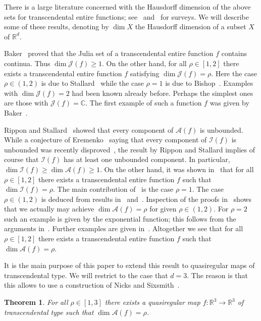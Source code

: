 \documentclass[12pt,a4paper]{amsart}
\theoremstyle{plain}
\newtheorem{theorem}{Theorem}[section]
\theoremstyle{definition}
\theoremstyle{remark}
\def\C{\mathbb C}
\def\R{\mathbb R}
\def\cA{\mathcal A}
\def\cI{\mathcal I}
\def\cJ{\mathcal J}
\numberwithin{equation}{section}
\begin{document}
There is a large literature concerned with the Hausdorff dimension of the above sets
for transcendental entire functions; see~\cite{Kotus2008} and~\cite{Stallard2008}
for surveys.
We will describe some of these results, denoting by
$\dim X$ the Hausdorff dimension of a subset $X$ of $\R^d$.

Baker~\cite{Baker1975} proved that the Julia set of 
a transcendental entire function $f$ contains continua.  Thus $\dim \cJ(f)\geq 1$.
On the other hand, for all $\rho\in[1,2]$ there exists a transcendental entire
function $f$ satisfying $\dim \cJ(f)=\rho$. Here the case $\rho\in (1,2)$ is due to 
Stallard~\cite[Theorem~1.1]{Stallard2000} while the case $\rho=1$ is due to 
Bishop~\cite{Bishop2018}. Examples with $\dim \cJ(f)=2$ had been known already before.
Perhaps the simplest ones are those with $\cJ(f)=\C$.
The first example of such a function $f$ was given by Baker~\cite{Baker1970}.

Rippon and Stallard~\cite[Theorem~1]{Rippon2005} showed that every component of 
$\cA(f)$ is unbounded. While a conjecture of Eremenko~\cite{Eremenko1989}
saying that every component of $\cI(f)$ is unbounded was recently 
disproved~\cite{Marti-Pete2022}, the result by Rippon and Stallard
implies of course that $\cI(f)$ has at 
least one unbounded component. In particular,
$\dim \cI(f)\geq \dim \cA(f)\geq 1$.
On the other hand, it was shown in~\cite[Corollary~1.2]{Rempe2010} that for all 
$\rho\in[1,2]$ there exists a transcendental entire function $f$ such that 
$\dim \cI(f)=\rho$. 
The main contribution of~\cite{Rempe2010} is the case $\rho=1$. The case
$\rho\in(1,2)$ is deduced from results in~\cite{Stallard2000} and~\cite{BKS}.
Inspection of the proofs in~\cite{BKS} shows that we actually may achieve
$\dim \cA(f)=\rho$ for given $\rho\in(1,2)$. 
For $\rho=2$ such an example is given by the exponential function;
this follows from the arguments in~\cite[Theorem~1.2]{McMullen1987}.
Further examples are given in~\cite{Sixsmith2015}.
Altogether we see that for all $\rho\in[1,2]$ there exists a transcendental
entire function $f$ such that $\dim \cA(f)=\rho$.

It is the main purpose of this paper to extend this result
to quasiregular maps of transcendental type.
We will restrict to the case that $d=3$. The reason is that this allows to use a
construction of Nicks and Sixsmith~\cite{Nicks2018}.

\begin{theorem}\label{theorem_dimA}
For all $\rho\in [1,3]$ there exists a quasiregular map 
$f\colon \mathbb{R}^3\to \mathbb{R}^3$ of transcendental type
such that $\dim \mathcal{A}(f)=\rho$.
\end{theorem}
\end{document}
